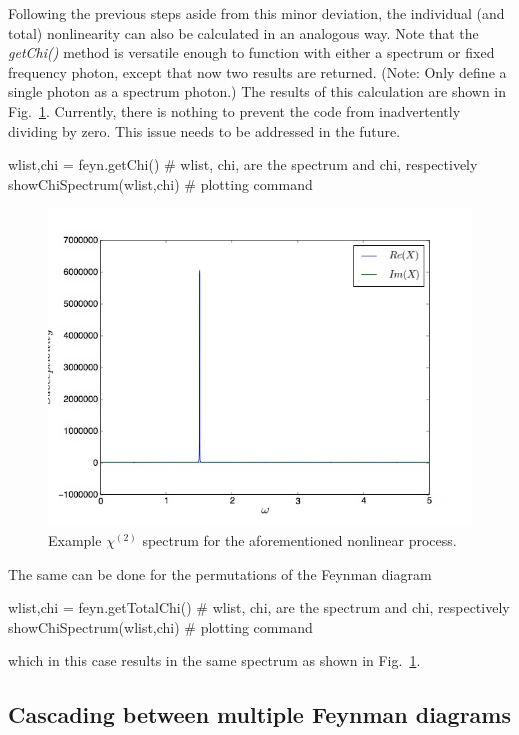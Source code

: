 \documentclass[11pt,a4paper,notitlepage]{article}
\begin{document}
Following the previous steps aside from this minor deviation, the individual (and total) nonlinearity can also be calculated in an analogous way. Note that the \textit{getChi()} method is versatile enough to function with either a spectrum or fixed frequency photon, except that now two results are returned. (Note: Only define a single photon as a spectrum photon.) The results of this calculation are shown in Fig.~\ref{fig:chi_spec}. Currently, there is nothing to prevent the code from inadvertently dividing by zero. This issue needs to be addressed in the future.

\begin{code}
wlist,chi = feyn.getChi()	# wlist, chi, are the spectrum and chi, respectively 
showChiSpectrum(wlist,chi)	# plotting command
\end{code}


\begin{figure}[h]
\centering\includegraphics[scale=0.5]{chi_spectrum_fix.jpg}
\caption{Example $\chi^{(2)}$ spectrum for the aforementioned nonlinear process.}
\label{fig:chi_spec}
\end{figure}

The same can be done for the permutations of the Feynman diagram

\begin{code}
wlist,chi = feyn.getTotalChi()	# wlist, chi, are the spectrum and chi, respectively 
showChiSpectrum(wlist,chi)	# plotting command
\end{code}
 which in this case results in the same spectrum as shown in Fig.~\ref{fig:chi_spec}.

\subsection{Cascading between multiple Feynman diagrams}
\end{document}
